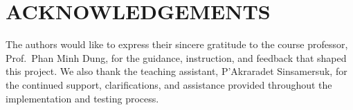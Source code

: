 \clearpage
{}
{}
\chapter*{ACKNOWLEDGEMENTS}

The authors would like to express their sincere gratitude to the course
professor, Prof.\ Phan Minh Dung, for the guidance, instruction, and
feedback that shaped this project. We also thank the teaching assistant,
P'Akraradet Sinsamersuk, for the continued support, clarifications, and
assistance provided throughout the implementation and testing process.
